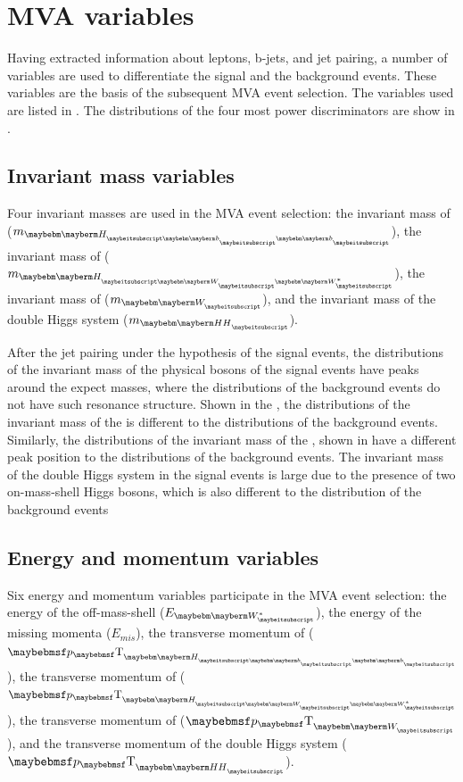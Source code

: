 \section{MVA variables}

Having extracted information about leptons, b-jets, and jet pairing, a number of variables are used to differentiate the signal and the background events. These variables are the basis of the subsequent MVA event selection. The variables used are listed in . The distributions of the four most power discriminators are show in .

\subsection{Invariant mass  variables}

Four invariant masses are used in the MVA event selection: the invariant mass of  \Hbb ($m_{\Hbb}$), the invariant mass of  \HWW ($m_{\HWW}$), the invariant mass of  \PW ($m_{\PW}$), and the invariant mass of the double Higgs system ($m_{\HH}$).

After the jet pairing under the hypothesis of the signal events, the distributions of the invariant mass of the physical bosons of the signal events have peaks around the expect masses, where the distributions of the  background events do not have such resonance structure. Shown in the , the distributions of the invariant mass of the \Hbb is  different to the distributions of the background events. Similarly, the distributions of the invariant mass of the \HWW, shown in  have a different peak position to the distributions of the background events.  The invariant mass of the double Higgs system in the signal events is large due to the presence of two on-mass-shell Higgs bosons, which is also different to the distribution of the background events

\subsection{Energy and momentum variables}

Six energy and momentum variables participate in the MVA event selection: the energy of the off-mass-shell \PW ($E_{\W*}$), the energy of the missing momenta ($E_{mis}$), the transverse momentum of \Hbb ($\pT_{\Hbb}$), the transverse momentum of \HWW ($\pT_{\HWW}$), the transverse momentum of \PW ($\pT_{\PW}$), and the transverse momentum of the double Higgs system ($\pT_{\HH}$).

